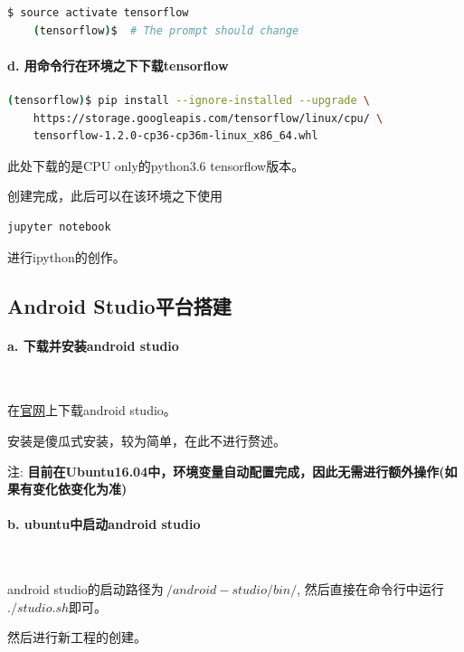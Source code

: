 \documentclass[UTF8, Microsoft YaHei]{book}
\begin{document}
    \begin{lstlisting}[language=bash]
    $ source activate tensorflow
    (tensorflow)$  # The prompt should change
    \end{lstlisting}

    \paragraph{d. 用命令行在环境之下下载tensorflow}

    \begin{lstlisting}[language=bash]
    (tensorflow)$ pip install --ignore-installed --upgrade \
    https://storage.googleapis.com/tensorflow/linux/cpu/ \
    tensorflow-1.2.0-cp36-cp36m-linux_x86_64.whl
    \end{lstlisting}

    此处下载的是CPU only的python3.6 tensorflow版本。

    创建完成，此后可以在该环境之下使用
    \begin{lstlisting}[language=bash]
    jupyter notebook
    \end{lstlisting}

    进行ipython的创作。

    \subsection{Android Studio平台搭建}
    \paragraph{a. 下载并安装android studio}

    ~

    在\href{https://developer.android.com/studio/index.html}{官网}上下载android studio。

    安装是傻瓜式安装，较为简单，在此不进行赘述。

    注: \textbf{目前在Ubuntu16.04中，环境变量自动配置完成，因此无需进行额外操作(如果有变化依变化为准)}

    \paragraph{b. ubuntu中启动android studio}

    ~

    android studio的启动路径为$~/android-studio/bin/$, 然后直接在命令行中运行$./studio.sh$即可。

    然后进行新工程的创建。
\end{document}
